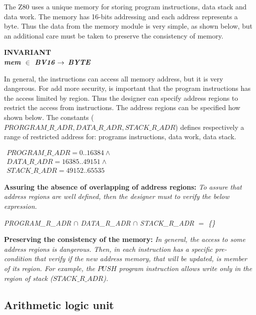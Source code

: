 \documentclass[11pt]{article} %
\begin{document}
The Z80 uses a unique memory for storing program instructions, data stack and data work. The memory has 16-bits
addressing and each address represents a byte. Thus the data from the memory module is very simple, as shown below,
but an additional care must be taken to preserve the consistency of memory.

\begin{sloppypar}
\bf INVARIANT \\
\hspace*{0.10in}\it mem  $\in$  \it BV16  $\rightarrow$  \it BYTE 

\end{sloppypar}
  
In general, the instructions can access all memory address, but it is very dangerous. For add more security, is
important that the program instructions has the access limited by region. Thus the designer can specify address
regions to restrict the access from instructions. The address regions can be specified how shown below.
The constants ($\mathit{PRORGRAM\_R\_ADR,DATA\_R\_ADR,STACK\_R\_ADR}$) defines respectively a range of restricted address
for: programs instructions, data work, data stack. 

$
\begin{array}{l}
\mathit{PROGRAM\_R\_ADR} = 0..16384 \land\\
\mathit{DATA\_R\_ADR} = 16385..49151 \land\\
\mathit{STACK\_R\_ADR} = 49152..65535
\end{array}
$

\textbf{Assuring the absence of overlapping of address regions:}
 \emph{To assure that address regions are well defined, then the designer must to verify the below expression.}

\begin{sloppypar}
\hspace*{0.10in}\it PROGRAM\_R\_ADR $\cap$ DATA\_R\_ADR $\cap$  STACK\_R\_ADR $=$ \{\}
\end{sloppypar}
 
\textbf{Preserving the consistency of the memory:} \emph{In general, the access to
some address regions is dangerous. Then, in each instruction has a specific pre-condition that verify
if the new address memory, that will be updated, is member of its region. For example, the $\mathit{PUSH}$
program instruction allows write only in the region of stack ($\mathit{STACK\_R\_ADR}$).}



\subsection{Arithmetic logic unit}
 
\end{document}
